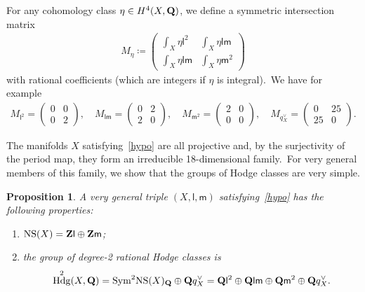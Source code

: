 \documentclass[12pt]{amsart}
\def\Z{{\bf Z}}
\def\Q{{\bf Q}}
\DeclareMathOperator{\Hdg}{Hdg}
\DeclareMathOperator{\NS}{NS}
\DeclareMathOperator{\Sym}{Sym}
\def\op{\oplus}
\newtheorem{prop}[lemm]{Proposition}
\theoremstyle{remark}
\def\lll{\ensuremath{\mathsf l}}
\def\mm{\ensuremath{\mathsf m}}
\begin{document}
For any  cohomology class
$\eta\in H^4(X,\Q)$, we define a symmetric intersection matrix
\begin{eqnarray}\label{eqmatriceO}
M_\eta\coloneqq
\begin{pmatrix}
\int_X\eta\lll^2& \int_X\eta\lll\mm \\
\int_X\eta\lll\mm & \int_X\eta\mm^2
\end{pmatrix}
\end{eqnarray}
with rational coefficients (which are integers if $\eta$ is integral).\
We have for example
\begin{eqnarray}\label{eqdematl2m2}
M_{\lll^2}=\begin{pmatrix}
0 & 0 \\
0 & 2
\end{pmatrix},\quad M_{\lll\mm}=\begin{pmatrix}
0 & 2 \\
2 & 0
\end{pmatrix}, \quad M_{\mm^2}=\begin{pmatrix}
2 & 0 \\
0 & 0
\end{pmatrix}, \quad M_{q_X^\vee}=\begin{pmatrix}
0 & 25 \\
25 & 0
\end{pmatrix}.
\end{eqnarray}


The manifolds $X$ satisfying~\eqref{hypo} are all projective and, by the surjectivity of the period map, they form an irreducible 18-dimensional family.\
For very general members of this family, we show that the groups of Hodge classes are very simple.


\begin{prop}\label{prop:SurfacesOnHK4}
A very general triple $(X,\lll,\mm)$ satisfying~\eqref{hypo} has the following properties:
\begin{enumerate}[{\rm (a)}]
\item\label{aaa} $\NS(X)=\Z\lll\op \Z\mm$;
\item\label{bbb} the group of degree-2 rational Hodge classes is
$$\Hdg^2(X,\Q)={\Sym}^2{\NS}(X)_{\Q}\op\Q q_X^\vee=\Q\lll^2\oplus \Q\lll\mm\op\Q\mm^2\op\Q q_X^\vee.$$
\end{enumerate}
\end{prop}
\end{document}
